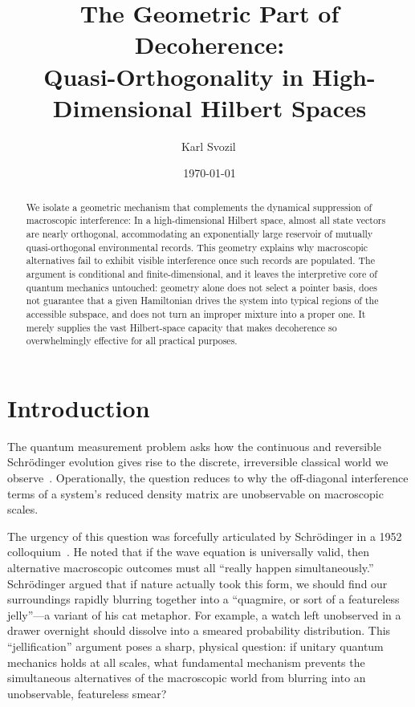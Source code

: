 \documentclass[aps,pra,reprint,superscriptaddress,nofootinbib,longbibliography]{revtex4-2}
\begin{document}
\title{The Geometric Part of Decoherence: \\ Quasi-Orthogonality in High-Dimensional Hilbert Spaces}

\author{Karl Svozil\,}

\date{\today}

\begin{abstract}
We isolate a geometric mechanism that complements the dynamical suppression of macroscopic interference: In a high-dimensional Hilbert space, almost all state vectors are nearly orthogonal, accommodating an exponentially large reservoir of mutually quasi-orthogonal environmental records. This geometry explains why macroscopic alternatives fail to exhibit visible interference once such records are populated. The argument is conditional and finite-dimensional, and it leaves the interpretive core of quantum mechanics untouched: geometry alone does not select a pointer basis, does not guarantee that a given Hamiltonian drives the system into typical regions of the accessible subspace, and does not turn an improper mixture into a proper one. It merely supplies the vast Hilbert-space capacity that makes decoherence so overwhelmingly effective for all practical purposes.
\end{abstract}

\maketitle

\section{Introduction}

The quantum measurement problem asks how the continuous and reversible Schr\"odinger evolution gives rise to the discrete, irreversible classical world we observe~\cite{schlosshauer-2007,schlosshauer-2019}. Operationally, the question reduces to why the off-diagonal interference terms of a system's reduced density matrix are unobservable on macroscopic scales.

The urgency of this question was forcefully articulated by Schr\"odinger in a 1952 colloquium~\cite{schroedinger-interpretation}. He noted that if the wave equation is universally valid, then alternative macroscopic outcomes must all ``really happen simultaneously.'' Schr\"odinger argued that if nature actually took this form, we should find our surroundings rapidly blurring together into a ``quagmire, or sort of a featureless jelly''---a variant of his cat metaphor. For example, a watch left unobserved in a drawer overnight should dissolve into a smeared probability distribution. This ``jellification'' argument poses a sharp, physical question: if unitary quantum mechanics holds at all scales, what fundamental mechanism prevents the simultaneous alternatives of the macroscopic world from blurring into an unobservable, featureless smear?
\end{document}
